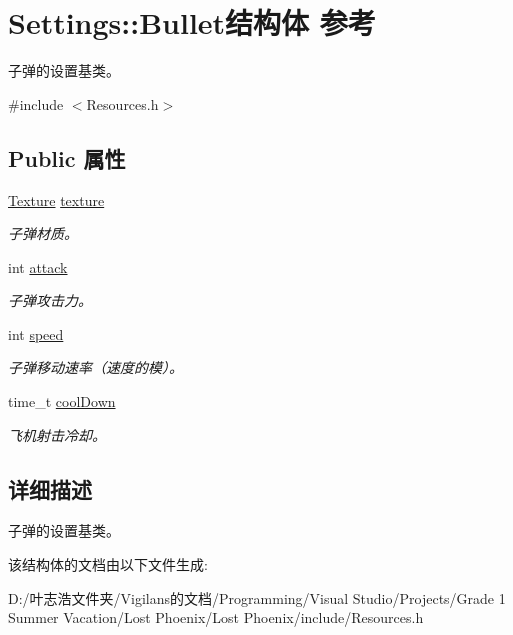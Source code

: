 \hypertarget{struct_settings_1_1_bullet}{}\section{Settings\+:\+:Bullet结构体 参考}
\label{struct_settings_1_1_bullet}


子弹的设置基类。  




{\ttfamily \#include $<$Resources.\+h$>$}

\subsection*{Public 属性}
\begin{DoxyCompactItemize}
\item 
\mbox{\label{struct_settings_1_1_bullet_a274a4b14c0bfaa540c5e60c273567bbd}} 
\hyperlink{struct_texture}{Texture} \hyperlink{struct_settings_1_1_bullet_a274a4b14c0bfaa540c5e60c273567bbd}{texture}
\begin{DoxyCompactList}\small\item\em 子弹材质。 \end{DoxyCompactList}\item 
\mbox{\label{struct_settings_1_1_bullet_a21e484cc6e290496e36a68da5b1a7b76}} 
int \hyperlink{struct_settings_1_1_bullet_a21e484cc6e290496e36a68da5b1a7b76}{attack}
\begin{DoxyCompactList}\small\item\em 子弹攻击力。 \end{DoxyCompactList}\item 
\mbox{\label{struct_settings_1_1_bullet_a8969e02d4dba2f87284855e0a141f6f3}} 
int \hyperlink{struct_settings_1_1_bullet_a8969e02d4dba2f87284855e0a141f6f3}{speed}
\begin{DoxyCompactList}\small\item\em 子弹移动速率（速度的模）。 \end{DoxyCompactList}\item 
\mbox{\label{struct_settings_1_1_bullet_aea74b608868e75f9bcf93100a38f0090}} 
time\+\_\+t \hyperlink{struct_settings_1_1_bullet_aea74b608868e75f9bcf93100a38f0090}{cool\+Down}
\begin{DoxyCompactList}\small\item\em 飞机射击冷却。 \end{DoxyCompactList}\end{DoxyCompactItemize}


\subsection{详细描述}
子弹的设置基类。 



该结构体的文档由以下文件生成\+:\begin{DoxyCompactItemize}
\item 
D\+:/叶志浩文件夹/\+Vigilans的文档/\+Programming/\+Visual Studio/\+Projects/\+Grade 1 Summer Vacation/\+Lost Phoenix/\+Lost Phoenix/include/Resources.\+h\end{DoxyCompactItemize}
